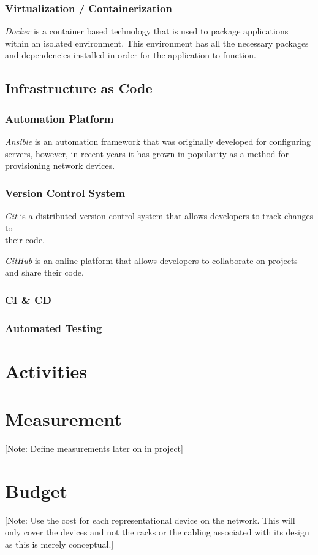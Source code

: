 \documentclass[12pt, letterpaper]{article}
\begin{document}
		\subsubsection{Virtualization / Containerization}
\textit{Docker} is a container based technology that is used to package applications within an isolated environment. This environment has all the necessary packages and dependencies installed in order for the application to function.
		
	\subsection{Infrastructure as Code}
	
		\subsubsection{Automation Platform}
\textit{Ansible} is an automation framework that was originally developed for configuring servers, however, in recent years it has grown in popularity as a method for provisioning network devices.

		\subsubsection{Version Control System}
\textit{Git} is a distributed version control system that allows developers to track changes to \\ their code.

\textit{GitHub} is an online platform that allows developers to collaborate on projects and share their code.

		\subsubsection{CI \& CD}
		
		
		\subsubsection{Automated Testing}
		

\newpage

\section{Activities}

\newpage

\section{Measurement}
[Note: Define measurements later on in project]

\newpage

\section{Budget}
[Note: Use the cost for each representational device on the network.
This will only cover the devices and not the racks or the cabling associated with its design as this is merely conceptual.]
\end{document}
